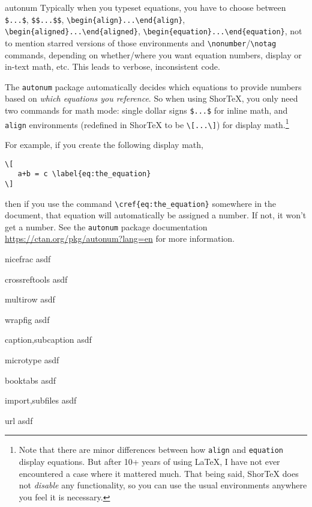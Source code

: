 \documentclass{article}
\begin{document}
\item[autonum] 
Typically when you typeset equations, you have to choose between 
\verb!$...$!, \verb!$$...$$!, 
\verb!\begin{align}...\end{align}!, 
\verb!\begin{aligned}...\end{aligned}!, 
\verb!\begin{equation}...\end{equation}!, 
not to mention starred versions of those environments 
and \verb!\nonumber!/\verb!\notag! commands, depending 
on whether/where you want equation numbers,
display or in-text math, etc. This leads to verbose, inconsistent code.

The \texttt{autonum} package automatically decides which equations to provide
numbers based on \textit{which equations you reference}. So when using ShorTeX,
you only need two commands for math mode: single dollar signs \verb!$...$! for
inline math, and \texttt{align} environments (redefined in ShorTeX to be
\verb!\[...\]!) for display math.\footnote{Note that there are minor
differences between how \texttt{align} and 
\texttt{equation} display equations. But after 10+ years of using \LaTeX, I have not ever
encountered a case where it mattered much. That being said, ShorTeX does not
\emph{disable} any functionality, so you can use the usual environments anywhere
you feel it is necessary.}

For example, if you create 
the following display math,
\begin{verbatim}
\[
   a+b = c \label{eq:the_equation}
\]
\end{verbatim}
then if you use the command \verb!\cref{eq:the_equation}! somewhere
in the document, that equation will automatically be assigned a number. If not, it
won't get a number. See the \texttt{autonum} package 
documentation \url{https://ctan.org/pkg/autonum?lang=en} for more information.

\item[nicefrac] asdf
\item[crossreftools] asdf
\item[multirow] asdf
\item[wrapfig] asdf
\item[caption,subcaption] asdf
\item[microtype] asdf
\item[booktabs] asdf
\item[import,subfiles] asdf
\item[url] asdf
\edesc
\end{document}
